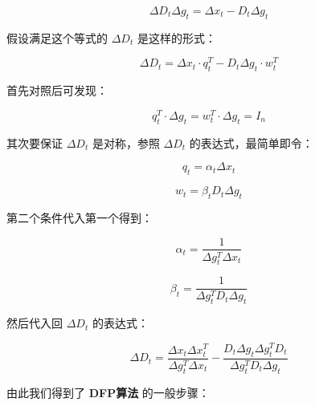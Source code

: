 \documentclass[UTF8]{ctexart}
\begin{document}
\begin{equation}
\Delta D_t \Delta g_t=\Delta x_t - D_t \Delta g_t
\end{equation}

假设满足这个等式的 $\Delta D_t$ 是这样的形式：

\begin{equation}
\Delta D_t=\Delta x_t \cdot q_t^T-D_t\Delta g_t\cdot w_t^T
\end{equation}

首先对照后可发现： \par

\begin{equation}
q_t^T\cdot \Delta g_t=w_t^T \cdot \Delta g_t = I_n
\end{equation}

其次要保证 $\Delta D_t$ 是对称，参照 $\Delta D_t$ 的表达式，最简单即令：

\begin{equation}
q_t=\alpha_t \Delta x_t
\end{equation}

\begin{equation}
w_t=\beta_t D_t\Delta g_t
\end{equation}

第二个条件代入第一个得到：

\begin{equation}
\alpha_t=\frac{1}{\Delta g_t^T\Delta x_t}
\end{equation}

\begin{equation}
\beta_t=\frac{1}{\Delta g_t^TD_t\Delta g_t}
\end{equation}

然后代入回 $\Delta D_t$ 的表达式：

\begin{equation}
\Delta D_t = \frac{\Delta x_t\Delta x_t^T}{\Delta g_t^T\Delta x_t}-\frac{D_t\Delta g_t\Delta g_t^TD_t}{\Delta g_t^TD_t\Delta g_t}
\end{equation}

由此我们得到了 \textbf{DFP算法} 的一般步骤： \par
\end{document}
